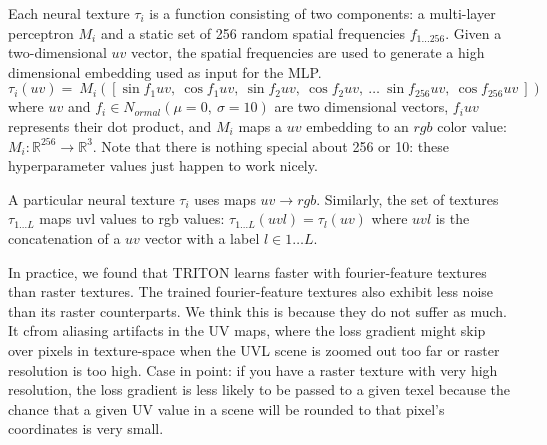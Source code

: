 \documentclass{article}
\begin{document}
	
	Each neural texture $\tau_i$ is a function consisting of two components: a multi-layer perceptron $M_i$ and a static set of 256 random spatial frequencies $f_{1...256}$. 
	Given a two-dimensional $uv$ vector, the spatial frequencies are used to generate a high dimensional embedding used as input for the MLP.
	\begin{equation}
			\tau_i(uv) = 
			\
			M_i\left(\left[
				\sin f_1 uv, \ 
				\cos f_1 uv, \ 
				\sin f_2 uv, \ 
				\cos f_2 uv, \ 
				\dots \ 
				\sin f_{256} uv, \ 
				\cos f_{256} uv \ 
			\right]\right)
	\end{equation}
	where $uv$ and $f_i \in N_{ormal}(\mu=0,\ \sigma=10)$ are two dimensional vectors,
	 $f_i uv$ represents their dot product, 
	 and $M_i$ maps a $uv$ embedding to an $rgb$ color value:
	 $M_i: \mathbb{R}^{256} \rightarrow \mathbb{R}^3$.
	Note that there is nothing special about 256 or 10: these hyperparameter values just happen to work nicely.
	
	A particular neural texture $\tau_i$ uses maps $uv \rightarrow rgb$. Similarly, the set of textures $\tau_{1\dots L}$ maps uvl values to rgb values: $\tau_{1\dots L}(uvl)=\tau_l(uv)$ where $uvl$ is the concatenation of a $uv$ vector with a label $l \in 1\dots L$.
	
	In practice, we found that TRITON learns faster with fourier-feature textures than raster textures. The trained fourier-feature textures also exhibit less noise than its raster counterparts. We think this is because they do not suffer as much. It cfrom aliasing artifacts in the UV maps, where the loss gradient might skip over pixels in texture-space when the UVL scene is zoomed out too far or raster resolution is too high. Case in point: if you have a raster texture with very high resolution, the loss gradient is less likely to be passed to a given texel because the chance that a given UV value in a scene will be rounded to that pixel's coordinates is very small.

\end{document}
